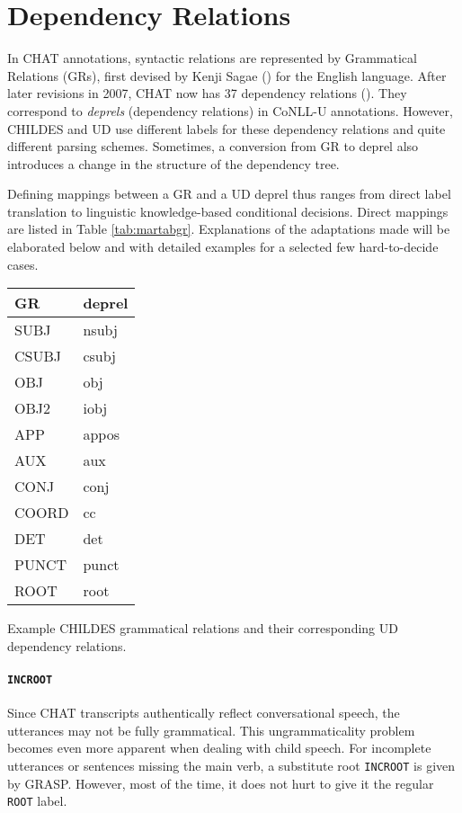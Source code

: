 \section{Dependency Relations}
\label{sec:deprel}

In CHAT annotations, syntactic relations are represented by Grammatical Relations (GRs), first devised by Kenji Sagae (\cite{sagae-etal-2004-adding}) for the English language. After later revisions in 2007, CHAT now has 37 dependency relations (\cite{sagae2007}). They correspond to \emph{deprels} (dependency relations) in CoNLL-U annotations. However, CHILDES and UD use different labels for these dependency relations and quite different parsing schemes. Sometimes, a conversion from GR to deprel also introduces a change in the structure of the dependency tree.

Defining mappings between a GR and a UD deprel thus ranges from direct label translation to linguistic knowledge-based conditional decisions. Direct mappings are listed in Table \ref{tab:martabgr}. Explanations of the adaptations made will be elaborated below and with detailed examples for a selected few hard-to-decide cases.

\begin{margintable}[1\baselineskip]
\begin{tabularx}{1\textwidth}{@{}Ll@{}}
\toprule
\textbf{GR} & \textbf{deprel}\\ \midrule
SUBJ & nsubj\\
CSUBJ & csubj\\
OBJ & obj\\
OBJ2 & iobj\\
APP & appos\\
AUX & aux\\
CONJ & conj\\
COORD & cc\\
DET & det\\
PUNCT & punct\\
ROOT & root\\\bottomrule
\end{tabularx}
\caption{\label{tab:martabgr}Example CHILDES grammatical relations and their corresponding UD dependency relations.}
\footnotesize
\end{margintable}

\paragraph{\texttt{INCROOT}}
Since CHAT transcripts authentically reflect conversational speech, the utterances may not be fully grammatical. This ungrammaticality problem becomes even more apparent when dealing with child speech. For incomplete utterances or sentences missing the main verb, a substitute root \texttt{INCROOT} is given by GRASP. However, most of the time, it does not hurt to give it the regular \texttt{ROOT} label.
\clearpage

